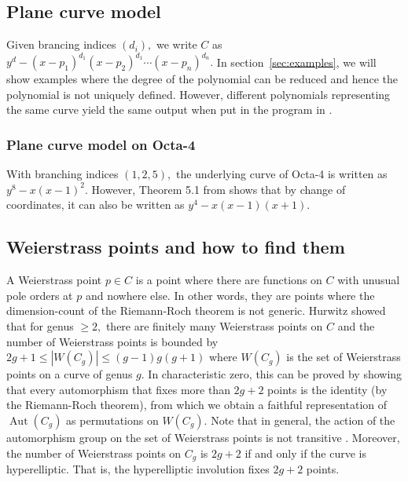 \documentclass[12pt,reqno]{amsart}
\DeclareMathOperator{\Aut}{Aut}
\theoremstyle{definition}
\theoremstyle{remark}
\begin{document}
\subsection{Plane curve model}
\label{subsec:polynomial} Given brancing indices $(d_i),$ we write $C$ as $y^d - (x - p_1)^{d_1} (x - p_2)^{d_1} \cdots (x - p_n)^{d_n}.$ In section~\ref{sec:examples}, we will show examples where the degree of the polynomial can be reduced and hence the polynomial is not uniquely defined. However, different polynomials representing the same curve yield the same output when put in the program in \cite{jeroen}.


\subsubsection*{Plane curve model on Octa-4}
With branching indices $(1, 2, 5),$ the underlying curve of Octa-4 is written as $y^8 - x (x-1)^2.$ However, Theorem 5.1 from \cite{dami} shows that by change of coordinates, it can also be written as $y^4 - x (x-1) (x+1).$

\subsection{Weierstrass points and how to find them}

A Weierstrass point $p \in C$ is a point where there are functions on $C$ with unusual pole orders at $p$ and nowhere else. In other words, they are points where the dimension-count of the Riemann-Roch theorem is not generic. Hurwitz showed that for genus $\geq 2,$ there are finitely many Weierstrass points on $C$ and the number of Weierstrass points is bounded by $2 g + 1 \leq |W(C_g)| \leq (g - 1) g (g + 1)$ where $W(C_g)$ is the set of Weierstrass points on a curve of genus $g.$ In characteristic zero, this can be proved by showing that every automorphism that fixes more than $2 g + 2$ points is the identity (by the Riemann-Roch theorem), from which we obtain a faithful representation of $\Aut(C_g)$ as permutations on $W(C_g)$. Note that in general, the action of the automorphism group on the set of Weierstrass points is not transitive \cite{sl}. Moreover, the number of Weierstrass points on $C_g$ is $2 g + 2$ if and only if the curve is hyperelliptic. That is, the hyperelliptic involution fixes $2 g + 2$ points. 
\end{document}
